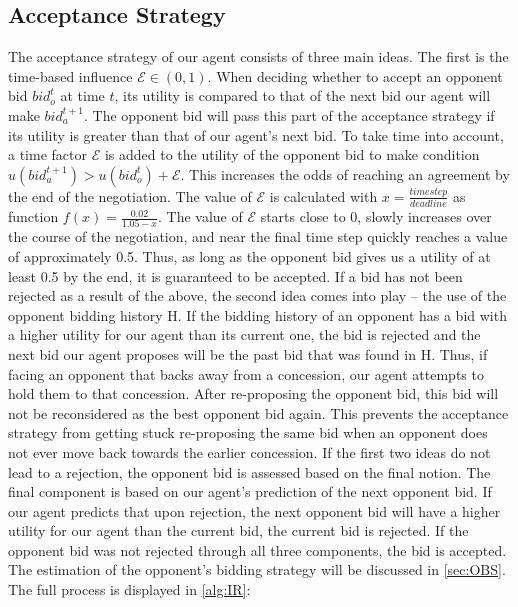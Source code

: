 \documentclass[a4paper,11pt]{article}
\theoremstyle{mytheor}
\begin{document}
\subsection{Acceptance Strategy}
The acceptance strategy of our agent consists of three main ideas. The first is the time-based influence $\mathcal{E} \in (0,1)$. When deciding whether to accept an opponent bid $bid_o^t$ at time $t$, its utility is compared to that of the next bid our agent will make $bid_a^{t+1}$. The opponent bid will pass this part of the acceptance strategy if its utility is greater than that of our agent's next bid. To take time into account, a time factor $\mathcal{E}$ is added to the utility of the opponent bid to make condition $u(bid_a^{t+1}) > u(bid_o^t) + \mathcal{E}$. This increases the odds of reaching an agreement by the end of the negotiation. The value of $\mathcal{E}$ is calculated with $x=\frac{time step}{deadline}$ as function $f(x)=\frac{0.02}{1.05 - x}$. The value of $\mathcal{E}$ starts close to 0, slowly increases over the course of the negotiation, and near the final time step quickly reaches a value of approximately 0.5. Thus, as long as the opponent bid gives us a utility of at least 0.5 by the end, it is guaranteed to be accepted. If a bid has not been rejected as a result of the above, the second idea comes into play – the use of the opponent bidding history H. If the bidding history of an opponent has a bid with a higher utility for our agent than its current one, the bid is rejected and the next bid our agent proposes will be the past bid that was found in H. Thus, if facing an opponent that backs away from a concession, our agent attempts to hold them to that concession. After re-proposing the opponent bid, this bid will not be reconsidered as the best opponent bid again. This prevents the acceptance strategy from getting stuck re-proposing the same bid when an opponent does not ever move back towards the earlier concession. If the first two ideas do not lead to a rejection, the opponent bid is assessed based on the final notion. The final component is based on our agent’s prediction of the next opponent bid. 
If our agent predicts that upon rejection, the next opponent bid will have a higher utility for our agent than the current bid, the current bid is rejected. If the opponent bid was not rejected through all three components, the bid is accepted. The estimation of the opponent's bidding strategy will be discussed in \autoref{sec:OBS}. The full process is displayed in \autoref{alg:IR}:\\
\end{document}
